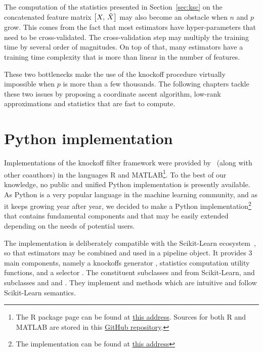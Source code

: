 The computation of the statistics presented in Section~\ref{sec:ksc}
on the concatenated feature matrix $\big[ X,\, \tilde{X} \big]$ may also become an obstacle when $n$ and $p$ grow.
This comes from the fact that most estimators have hyper-parameters that need to be cross-validated.
The cross-validation step may multiply the training time by several order of magnitudes.
On top of that, many estimators have a training time complexity that is more than linear in the number of features.

\bigbreak
These two bottlenecks make the use of the knockoff procedure
virtually impossible when $p$ is more than a few thousands.
The following chapters tackle these two issues by proposing
a coordinate ascent algorithm, low-rank approximations
and statistics that are fast to compute.

\section{Python implementation}\label{sec:python_implementation}

Implementations of the knockoff filter framework were provided by~\cite{fixed_x_knockoffs, model_x_knockoffs}
(along with other coauthors) in the languages R and MATLAB\footnote{
    The R package page can be found at
    \href{https://cran.r-project.org/web/packages/knockoff/index.html}{this address}.
    Sources for both R and MATLAB are stored in this
    \href{https://github.com/msesia/knockoff-filter}{GitHub repository}.
}.
To the best of our knowledge, no public and unified Python implementation is presently available.
As Python is a very popular language in the machine learning community,
and as it keeps growing year after year,
we decided to make a Python implementation\footnote{
    The implementation can be found at
    \href{}{this address}
} that contains fundamental components and that may be easily extended
depending on the needs of potential users.

The implementation is deliberately compatible with the Scikit-Learn ecosystem~\citep{sklearn},
so that estimators may be combined and used in a pipeline object.
It provides 3 main components,
namely a knockoffs generator ,
statistics computation utility functions,
and a selector .
The constituent  subclasses
 and  from Scikit-Learn,
and  subclasses
and  and .
They implement  and  methods which are intuitive and follow Scikit-Learn semantics.

